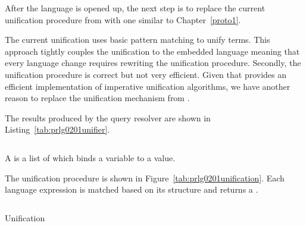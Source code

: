 \documentclass[thesis-solanki.tex]{subfiles}
\begin{document}
After the language is opened up, the next step is to replace the current unification procedure from
 \cite{prolog-lib} with one similar to Chapter~\ref{proto1}.


The current unification uses basic pattern matching to unify terms.
This approach tightly couples the unification to the embedded language meaning that every language change requires
rewriting the unification procedure.
Secondly, the unification procedure is correct but not very efficient.
Given that  \cite{unification-fd-lib} provides an efficient implementation of
imperative unification algorithms, we have another reason to replace the unification mechanism from
 \cite{prolog-lib}.

The results produced by the query resolver are shown in Listing~\ref{tab:prlg0201unifier}.
\begin{code-list}[H]
\begin{singlespace}
\inputminted{haskell}{haskell-proto2-prlg-0201-unifier.hs}
\end{singlespace}
\caption{ }
\label{tab:prlg0201unifier}
\end{code-list}

A  is a list of  which binds a variable to a value.

The unification procedure is shown in Figure~\ref{tab:prlg0201unification}.
Each language expression is matched based on its structure and returns a  .


\begin{code-list}[H]
  \begin{singlespace}
    \inputminted[linenos,fontsize=\small]{haskell}{haskell-proto2-unification-lion.hs}
  \end{singlespace}
\caption{ Unification}
\label{tab:prlg0201unification}
\end{code-list}

\end{document}
